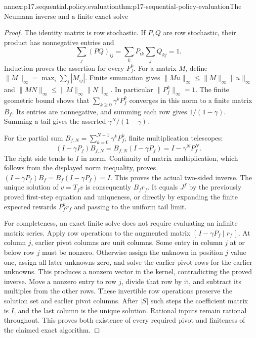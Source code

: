 \begin{annexitem}{annex:p17.sequential.policy.evaluation}{thm:p17-sequential-policy-evaluation}{The Neumann inverse and a finite exact solve}
\begin{proof}
The identity matrix is row stochastic.
If \(P,Q\) are row stochastic, their product has
nonnegative entries and
\[
                    \sum_j(PQ)_{ij}
                      =\sum_kP_{ik}\sum_jQ_{kj}=1.
\]
Induction proves the assertion for every \(P_f^k\).
For a matrix \(M\), define
\(\|M\|_\infty=\max_i\sum_j|M_{ij}|\).
Finite summation gives
\(\|Mu\|_\infty\leq\|M\|_\infty\|u\|_\infty\)
and
\(\|MN\|_\infty\leq\|M\|_\infty\|N\|_\infty\).
In particular \(\|P_f^k\|_\infty=1\).
The finite geometric bound shows that
\(\sum_{k\geq0}\gamma^kP_f^k\) converges in this norm
to a finite matrix \(B_f\). Its entries are
nonnegative, and summing each row gives
\(1/(1-\gamma)\). Summing a tail gives the
asserted \(\gamma^N/(1-\gamma)\).

For the partial sum \(B_{f,N}=\sum_{k=0}^{N-1}\gamma^kP_f^k\),
finite multiplication telescopes:
\[
       (I-\gamma P_f)B_{f,N}
          =B_{f,N}(I-\gamma P_f)=I-\gamma^NP_f^N .
\]
The right side tends to \(I\) in norm.
Continuity of matrix multiplication, which follows
from the displayed norm inequality, proves
\((I-\gamma P_f)B_f=B_f(I-\gamma P_f)=I\).
This proves the actual two-sided inverse.
The unique solution of \(v=T_fv\) is consequently
\(B_fr_f\). It equals \(J^f\) by the previously
proved first-step equation and uniqueness, or
directly by expanding the finite expected rewards
\(P_f^kr_f\) and passing to the uniform tail limit.

For completeness, an exact finite solve does not
require evaluating an infinite matrix series.
Apply row operations to the augmented matrix
\([\,I-\gamma P_f\mid r_f\,]\).
At column \(j\), earlier pivot columns are unit
columns. Some entry in column \(j\) at or below
row \(j\) must be nonzero. Otherwise assign the
unknown in position \(j\) value one, assign all
later unknowns zero, and solve the earlier pivot
rows for the earlier unknowns. This produces a
nonzero vector in the kernel, contradicting the
proved inverse. Move a nonzero entry to row \(j\),
divide that row by it, and subtract its multiples
from the other rows. These invertible row
operations preserve the solution set and earlier
pivot columns. After \(|S|\) such steps the
coefficient matrix is \(I\), and the last column
is the unique solution. Rational inputs remain
rational throughout. This proves both existence
of every required pivot and finiteness of the
claimed exact algorithm.
\end{proof}
\end{annexitem}

